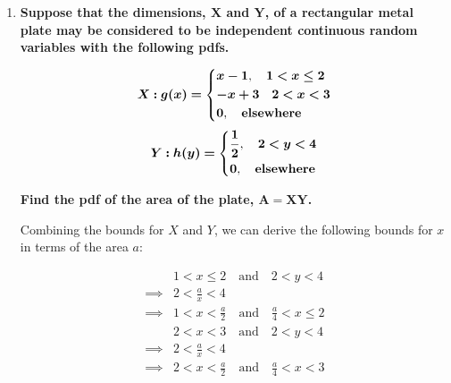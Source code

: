 \documentclass[10pt, oneside]{article}
\begin{document}
\begin{enumerate}[label=6.\arabic*]
	To find the marginal pdf of $X$, we calculate piecewise over the intervals $(0, 1)$ and $(-1, 0)$:
	
	\begin{align*}
	g(x) &= \begin{dcases}
	 \int^{-x + 1}_{x - 1} \frac{1}{2} \ dy, \quad 0 < x < 1 \\
	 \int^{x+1}_{-x-1} \frac{1}{2} \ dy, \quad -1 < x < 0
	 \end{dcases} \\
	 &= \begin{dcases}
	 1 - x, \quad 0 < x < 1 \\
	 1 + x, \quad -1 < x < 0
	 \end{dcases}
	 \end{align*}

	In the interest of brevity, we may write $\boxed{g(x) = 1 - |x|, -1 < x < 1}$ is the marginal pdf of $X$. By symmetry, $\boxed{h(y) = 1 - |y|, -1 < y < 1}$ is the marginal pdf of $Y$.

\item  \begin{tcolorbox}[
  colback=Cerulean!5!white,
  colframe=Cerulean!75!black]
\textbf{Suppose that the dimensions, $\bm{X}$ and $\bm{Y}$, of a rectangular metal plate may be considered to be independent continuous random variables with the following pdfs.}

\[
\bm{X: g(x) =} \begin{dcases}
\bm{x - 1}, \quad \bm{1 < x \leq 2} \\
\bm{-x + 3} \quad \bm{2 < x < 3} \\
\bm{0}, \quad \textbf{elsewhere}
\end{dcases}
\]
\[
\bm{Y: h(y) =} \begin{dcases}
\bm{\frac{1}{2}}, \quad \bm{2 < y < 4} \\
\bm{0}, \quad \textbf{elsewhere}
\end{dcases}
\]

\textbf{Find the pdf of the area of the plate, $\bm{A = XY}$.}
\end{tcolorbox}

Combining the bounds for $X$ and $Y$, we can derive the following bounds for $x$ in terms of the area $a$:

\begin{align*}
&1 < x \leq 2 \quad \text{and} \quad 2 < y < 4 \\
\implies &2 < \frac{a}{x} < 4 \\
\implies &\boxed{1 < x < \frac{a}{2}} \quad \text{and} \quad \boxed{\frac{a}{4} < x \leq 2} \\
&2 < x < 3 \quad \text{and} \quad 2 < y < 4 \\
\implies &2 < \frac{a}{x} < 4 \\
\implies &\boxed{ 2 < x < \frac{a}{2} } \quad \text{and} \quad \boxed{ \frac{a}{4} < x < 3 }
\end{align*}


\end{enumerate}
\end{document}
